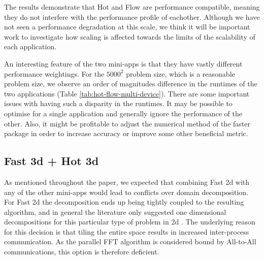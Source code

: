 \documentclass[runningheads,a4paper]{llncs}
\begin{document}
%


The results demonstrate that Hot and Flow are performance compatible, meaning they do not interfere with the performance profile of eachother. Although we have not seen a performance degradation at this scale, we think it will be important work to investigate how scaling is affected towards the limits of the scalability of each application.

An interesting feature of the two mini-apps is that they have vastly different performance weightings. For the $5000^2$ problem size, which is a reasonable problem size, we observe an order of magnitudes difference in the runtimes of the two applications (Table \ref{tab:hot-flow-multi-device}). There are some important issues with having such a disparity in the runtimes. It may be possible to optimise for a single application and generally ignore the performance of the other. Also, it might be profitable to adjust the numerical method of the faster package in order to increase accuracy or improve some other beneficial metric.


\subsection{Fast 3d + Hot 3d}

As mentioned throughout the paper, we expected that combining Fast 2d with any of the other mini-apps would lead to conflicts over domain decomposition. For Fast 2d the decomposition ends up being tightly coupled to the resulting algorithm, and in general the literature only suggested one dimensional decompositions for this particular type of problem in 2d \cite{}. The underlying reason for this decision is that tiling the entire space results in increased inter-process communication. As the parallel FFT algorithm is considered bound by All-to-All communications, this option is therefore deficient.
\end{document}
